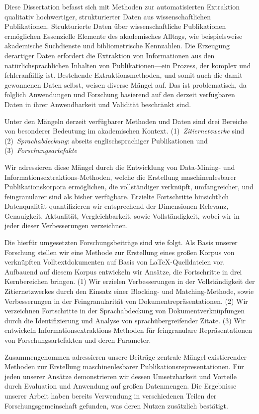 \Abstract[Zusammenfassung]{}
Diese Dissertation befasst sich mit Methoden zur automatisierten Extraktion qualitativ hochwertiger, strukturierter Daten aus wissenschaftlichen Publikationen.
Strukturierte Daten über wissenschaftliche Publikationen ermöglichen Essenzielle Elemente des akademisches Alltags, wie beispielsweise akademische Suchdienste und bibliometrische Kennzahlen.
Die Erzeugung derartiger Daten erfordert die Extraktion von Informationen aus den natürlichsprachlichen Inhalten von Publikationen---ein Prozess, der komplex und fehleranfällig ist.
Bestehende Extraktionsmethoden, und somit auch die damit gewonnenen Daten selbst, weisen diverse Mängel auf. Das ist problematisch, da folglich Anwendungen und Forschung basierend auf den derzeit verfügbaren Daten in ihrer Anwendbarkeit und Validität beschränkt sind.

Unter den Mängeln derzeit verfügbarer Methoden und Daten sind drei Bereiche von besonderer Bedeutung im akademischen Kontext.
(1)~\emph{Zitiernetzwerke} sind 
(2)~\emph{Sprachabdeckung}: abseits englischsprachiger Publikationen und
(3)~\emph{Forschungsartefakte}

Wir adressieren diese Mängel durch die Entwicklung von Data-Mining- und In\-for\-ma\-tions\-ex\-trak\-tions-Methoden, welche die Erstellung maschinenlesbarer Publikationskorpora ermöglichen, die vollständiger verknüpft, umfangreicher, und feingranularer sind als bisher verfügbare. Erzielte Fortschritte hinsichtlich Datenqualität quantifizieren wir entsprechend der Dimensionen Relevanz, Genauigkeit, Aktualität, Vergleichbarkeit, sowie Vollständigkeit, wobei wir in jeder dieser Verbesserungen verzeichnen.

Die hierfür umgesetzten Forschungsbeiträge sind wie folgt.
Als Basis unserer Forschung stellen wir eine Methode zur Erstellung eines großen Korpus von verknüpften Volltextdokumenten auf Basis von \LaTeX-Quelldateien vor.
Aufbauend auf diesem Korpus entwickeln wir Ansätze, die Fortschritte in drei Kernbereichen bringen.
(1) Wir erzielen Verbesserungen in der Vollständigkeit der Zitiernetzwerkes durch den Einsatz einer Blocking- und Matching-Methode, sowie Verbesserungen in der Feingranularität von Dokumentrepräsentationen.
(2) Wir verzeichnen Fortschritte in der Sprachabdeckung von Dokumentverknüpfungen durch die Identifizierung und Analyse von sprachübergreifender Zitate.
(3) Wir entwickeln In\-for\-ma\-tions\-ex\-trak\-tions-Methoden für feingranulare Repräsentationen von Forschungsartefakten und deren Parameter.

Zusammengenommen adressieren unsere Beiträge zentrale Mängel existierender Methoden zur Erstellung maschinenlesbarer Publikationsrepresentationen.
Für jeden unserer Ansätze demonstrieren wir dessen Umsetzbarkeit und Vorteile durch Evaluation und Anwendung auf großen Datenmengen.
Die Ergebnisse unserer Arbeit haben bereits Verwendung in verschiedenen Teilen der Forschungsgemeinschaft gefunden, was deren Nutzen zusätzlich bestätigt.
